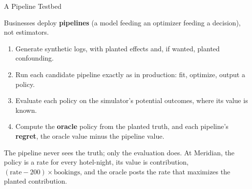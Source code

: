 \documentclass[aspectratio=169, 11pt, handout]{beamer}
\begin{document}
\begin{frame}{A Pipeline Testbed}

Businesses deploy \textbf{pipelines} (a model feeding an optimizer feeding a decision), not estimators.
\begin{enumerate}
  \item Generate synthetic logs, with planted effects and, if wanted, planted confounding.
  \item Run each candidate pipeline exactly as in production: fit, optimize, output a policy.
  \item Evaluate each policy on the simulator's potential outcomes, where its value is known.
  \item Compute the \textbf{oracle} policy from the planted truth, and each pipeline's \textbf{regret}, the oracle value minus the pipeline value.
\end{enumerate}

\begin{center}
\end{center}

\small The pipeline never sees the truth; only the evaluation does. At Meridian, the policy is a rate for every hotel-night, its value is contribution, $(\text{rate} - 200) \times \text{bookings}$, and the oracle posts the rate that maximizes the planted contribution.
\end{frame}
\end{document}
